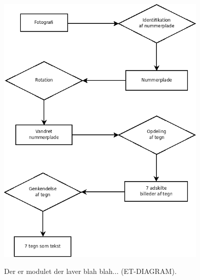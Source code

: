 \documentclass[11pt,a4paper,draft]{article}
\begin{document}
\includegraphics[width=10cm]{indledning/illu/overordnet_system.png} 

Der er modulet der laver blah blah... (ET-DIAGRAM).
\end{document}
